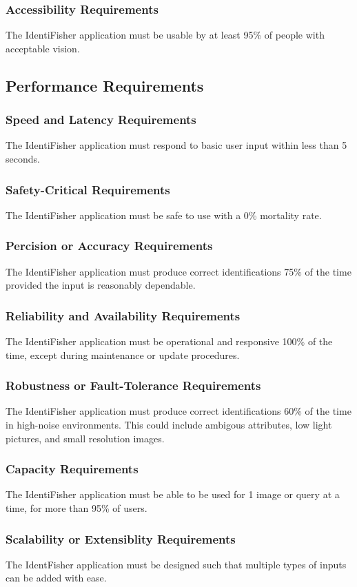 \documentclass{article}
\begin{document}
\subsubsection{Accessibility Requirements}
The IdentiFisher application must be usable by at least 95\% of people with acceptable vision.
\subsection{Performance Requirements}
\subsubsection{Speed and Latency Requirements}
The IdentiFisher application must respond to basic user input within less than 5 seconds.
\subsubsection{Safety-Critical Requirements}
The IdentiFisher application must be safe to use with a 0\% mortality rate.
\subsubsection{Percision or Accuracy Requirements}
The IdentiFisher application must produce correct identifications 75\% of the time provided the input is reasonably dependable.
\subsubsection{Reliability and Availability Requirements}
The IdentiFisher application must be operational and responsive 100\% of the time, except during maintenance or update procedures.
\subsubsection{Robustness or Fault-Tolerance Requirements}
The IdentiFisher application must produce correct identifications 60\% of the time in high-noise environments. This could include
ambigous attributes, low light pictures, and small resolution images.
\subsubsection{Capacity Requirements}
The IdentiFisher application must be able to be used for 1 image or query at a time, for more than 95\% of users.
\subsubsection{Scalability or Extensiblity Requirements}
The IdentFisher application must be designed such that multiple types of inputs can be added with ease.
\end{document}

